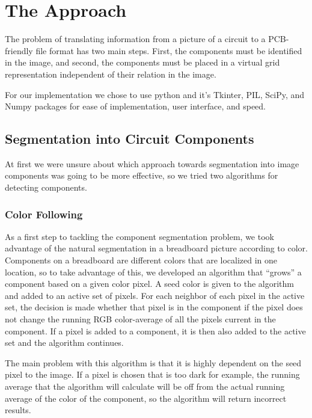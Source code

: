 \documentclass[10pt,twocolumn,letterpaper]{article}
\begin{document}
\section{The Approach}

The problem of translating information from a picture of a circuit to a
PCB-friendly file format has two main steps. First, the components must be
identified in the image, and second, the components must be placed in a virtual
grid representation independent of their relation in the image. 

For our implementation we chose to use python and it's Tkinter, PIL, SciPy, and
Numpy packages for ease of implementation, user interface, and speed. 

\subsection{Segmentation into Circuit Components}

At first we were unsure about which approach towards segmentation into image
components was going to be more effective, so we tried two algorithms for
detecting components. 

\subsubsection{Color Following}

As a first step to tackling the component segmentation problem, we took
advantage of the natural segmentation in a breadboard picture according to
color. Components on a breadboard are different colors that are localized in
one location, so to take advantage of this, we developed an algorithm that
``grows'' a component based on a given color pixel. A seed color is given to
the algorithm and added to an active set of pixels. For each neighbor of each
pixel in the active set, the decision is made whether that pixel is in the
component if the pixel does not change the running RGB color-average of all the
pixels current in the component. If a pixel is added to a component, it is then
also added to the active set and the algorithm continues.     

The main problem with this algorithm is that it is highly dependent on the seed
pixel to the image. If a pixel is chosen that is too dark for example, the
running average that the algorithm will calculate will be off from the actual
running average of the color of the component, so the algorithm will return
incorrect results.   
\end{document}
